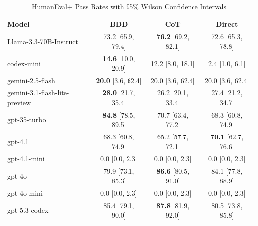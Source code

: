 \begin{table}[htbp]
\centering
\caption{HumanEval+ Pass Rates with 95\% Wilson Confidence Intervals}
\label{tab:humaneval_plus_full}
\begin{tabular}{lccc}
\toprule
Model & BDD & CoT & Direct \\
\midrule
Llama-3.3-70B-Instruct & 73.2 [65.9, 79.4] & \textbf{76.2} [69.2, 82.1] & 72.6 [65.3, 78.8] \\
codex-mini & \textbf{14.6} [10.0, 20.9] & 12.2 [8.0, 18.1] & 2.4 [1.0, 6.1] \\
gemini-2.5-flash & \textbf{20.0} [3.6, 62.4] & 20.0 [3.6, 62.4] & 20.0 [3.6, 62.4] \\
gemini-3.1-flash-lite-preview & \textbf{28.0} [21.7, 35.4] & 26.2 [20.1, 33.4] & 27.4 [21.2, 34.7] \\
gpt-35-turbo & \textbf{84.8} [78.5, 89.5] & 70.7 [63.4, 77.2] & 68.3 [60.8, 74.9] \\
gpt-4.1 & 68.3 [60.8, 74.9] & 65.2 [57.7, 72.1] & \textbf{70.1} [62.7, 76.6] \\
gpt-4.1-mini & 0.0 [0.0, 2.3] & 0.0 [0.0, 2.3] & 0.0 [0.0, 2.3] \\
gpt-4o & 79.9 [73.1, 85.3] & \textbf{86.6} [80.5, 91.0] & 84.1 [77.8, 88.9] \\
gpt-4o-mini & 0.0 [0.0, 2.3] & 0.0 [0.0, 2.3] & 0.0 [0.0, 2.3] \\
gpt-5.3-codex & 85.4 [79.1, 90.0] & \textbf{87.8} [81.9, 92.0] & 80.5 [73.8, 85.8] \\
\bottomrule
\end{tabular}
\end{table}
